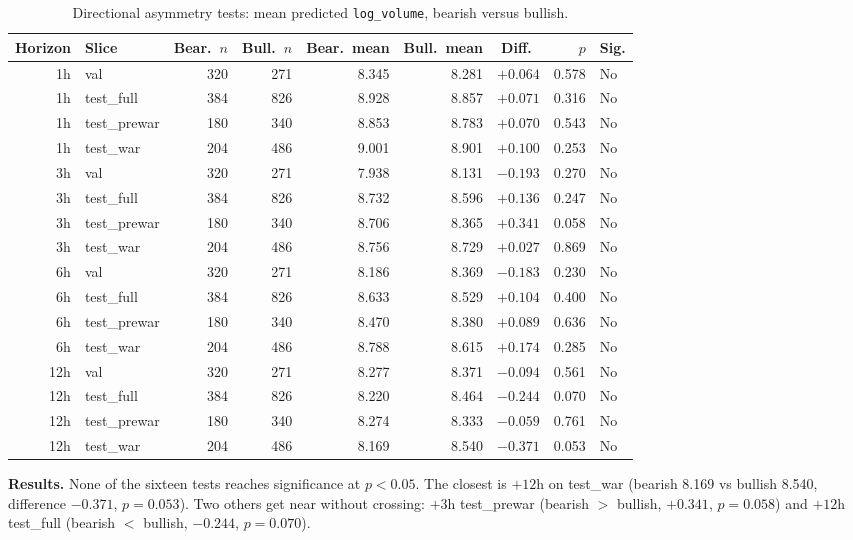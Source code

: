 \begin{table}[h]
  \centering
  \small
  \caption{Directional asymmetry tests: mean predicted \texttt{log\_volume}, bearish versus bullish.}
  \label{tab:asymmetry-tests}
  \begin{tabular}{@{}rlrrrrrrl@{}}
    \toprule
    Horizon & Slice & Bear.\ $n$ & Bull.\ $n$ & Bear.\ mean & Bull.\ mean & Diff.\ & $p$ & Sig. \\
    \midrule
    1h & val & 320 & 271 & 8.345 & 8.281 & $+0.064$ & 0.578 & No \\
    1h & test\_full & 384 & 826 & 8.928 & 8.857 & $+0.071$ & 0.316 & No \\
    1h & test\_prewar & 180 & 340 & 8.853 & 8.783 & $+0.070$ & 0.543 & No \\
    1h & test\_war & 204 & 486 & 9.001 & 8.901 & $+0.100$ & 0.253 & No \\
    3h & val & 320 & 271 & 7.938 & 8.131 & $-0.193$ & 0.270 & No \\
    3h & test\_full & 384 & 826 & 8.732 & 8.596 & $+0.136$ & 0.247 & No \\
    3h & test\_prewar & 180 & 340 & 8.706 & 8.365 & $+0.341$ & 0.058 & No \\
    3h & test\_war & 204 & 486 & 8.756 & 8.729 & $+0.027$ & 0.869 & No \\
    6h & val & 320 & 271 & 8.186 & 8.369 & $-0.183$ & 0.230 & No \\
    6h & test\_full & 384 & 826 & 8.633 & 8.529 & $+0.104$ & 0.400 & No \\
    6h & test\_prewar & 180 & 340 & 8.470 & 8.380 & $+0.089$ & 0.636 & No \\
    6h & test\_war & 204 & 486 & 8.788 & 8.615 & $+0.174$ & 0.285 & No \\
    12h & val & 320 & 271 & 8.277 & 8.371 & $-0.094$ & 0.561 & No \\
    12h & test\_full & 384 & 826 & 8.220 & 8.464 & $-0.244$ & 0.070 & No \\
    12h & test\_prewar & 180 & 340 & 8.274 & 8.333 & $-0.059$ & 0.761 & No \\
    12h & test\_war & 204 & 486 & 8.169 & 8.540 & $-0.371$ & 0.053 & No \\
    \bottomrule
  \end{tabular}
\end{table}

\textbf{Results.} None of the sixteen tests reaches significance at $p < 0.05$. The closest is $+12$h on test\_war (bearish 8.169 vs bullish 8.540, difference $-0.371$, $p = 0.053$). Two others get near without crossing: $+3$h test\_prewar (bearish $>$ bullish, $+0.341$, $p = 0.058$) and $+12$h test\_full (bearish $<$ bullish, $-0.244$, $p = 0.070$).

